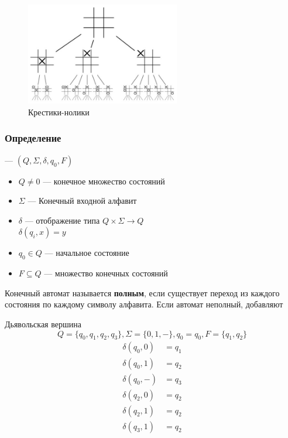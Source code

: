\documentclass[a4paper, 14pt]{extarticle}
\begin{document}
\begin{figure}[h]
    \centering
    \includegraphics[width=0.6\textwidth]{./img/L2/S003.jpg}
    \caption{Крестики-нолики}
\end{figure}

\FloatBarrier{}

\subsubsection{Определение}
 --- $ ( Q, \Sigma, \delta, q_0, F ) $ 
\begin{itemize}
    \item $Q \ne 0$ --- конечное множество состояний 
    \item $\Sigma$ --- Конечный входной алфавит
    \item $\delta$ --- отображение типа $Q \times \Sigma \rightarrow Q$\\
    $\delta (q_i, x) = y$
    \item $q_0 \in Q$ --- начальное состояние
    \item $F \subseteq Q$ --- множество конечных состояний
\end{itemize}

Конечный автомат называется \textbf{полным}, если существует переход из каждого состояния по каждому символу алфавита. Если автомат неполный, добавляют 

\begin{example}{Дьявольская вершина}
    \[ Q = \{ q_0, q_1, q_2, q_3 \}, \Sigma = \{0, 1, -\}, q_0 = q_0, F = \{ q_1, q_2 \} \]
    \begin{align*}
        \delta(q_0, 0) &= q_1 \\
        \delta(q_0, 1) &= q_2 \\
        \delta(q_0, -) &= q_3 \\
        \delta(q_2, 0) &= q_2 \\
        \delta(q_2, 1) &= q_2 \\
        \delta(q_3, 1) &= q_2
    \end{align*}
    
\end{example}
\end{document}
